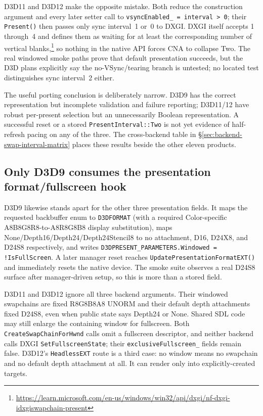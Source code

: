 D3D11 and D3D12 make the opposite mistake. Both reduce the construction argument and every
later setter call to \texttt{vsyncEnabled\_ = interval > 0}; their
\texttt{Present()} then passes only sync interval~1 or~0 to DXGI. DXGI itself accepts
1 through~4 and defines them as waiting for at least the corresponding number of vertical
blanks,\footnote{\url{https://learn.microsoft.com/en-us/windows/win32/api/dxgi/nf-dxgi-idxgiswapchain-present}}
so nothing in the native API forces CNA to collapse Two. The real windowed smoke paths prove
that default presentation succeeds, but the D3D plans explicitly say the no-VSync/tearing
branch is untested; no located test distinguishes sync interval~2 either.

The useful porting conclusion is deliberately narrow. D3D9 has the correct representation
but incomplete validation and failure reporting; D3D11/12 have robust per-present selection
but an unnecessarily Boolean representation. A successful reset or a stored
\texttt{PresentInterval::Two} is not yet evidence of half-refresh pacing on any of the three.
The cross-backend table in \S\ref{sec:backend-swap-interval-matrix} places these results beside
the other eleven products.

\subsection{Only D3D9 consumes the presentation format/fullscreen hook}

D3D9 likewise stands apart for the other three presentation fields. It maps the requested
backbuffer enum to \texttt{D3DFORMAT} (with a required Color-specific A8B8G8R8-to-A8R8G8B8
display substitution), maps None/Depth16/Depth24/Depth24Stencil8 to no attachment,
D16, D24X8, and D24S8 respectively, and writes
\texttt{D3DPRESENT\_PARAMETERS.Windowed = !IsFullScreen}. A later manager reset reaches
\texttt{UpdatePresentationFormatEXT()} and immediately resets the native device. The smoke
suite observes a real D24S8 surface after manager-driven setup, so this is more than a stored
field.

D3D11 and D3D12 ignore all three backend arguments. Their windowed swapchains are fixed
R8G8B8A8 UNORM and their default depth attachments fixed D24S8, even when public state says
Depth24 or None. Shared SDL code may still enlarge the containing window for fullscreen.
Both \texttt{CreateSwapChainForHwnd} calls omit a fullscreen descriptor, and neither backend
calls DXGI \texttt{SetFullscreenState}; their \texttt{exclusiveFullscreen\_} fields remain false.
D3D12's \texttt{HeadlessEXT} route is a third case: no window means no swapchain and no
default depth attachment at all. It can render only into explicitly-created targets.

